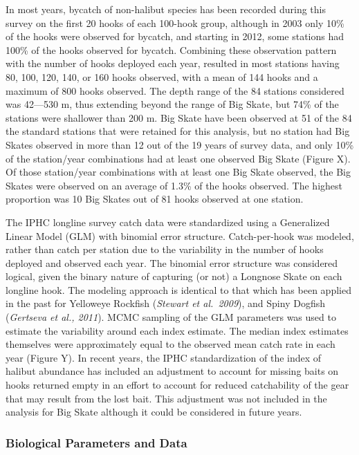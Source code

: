 \documentclass[12pt,]{article}
\begin{document}
In most years, bycatch of non-halibut species has been recorded during
this survey on the first 20 hooks of each 100-hook group, although in
2003 only 10\% of the hooks were observed for bycatch, and starting in
2012, some stations had 100\% of the hooks observed for bycatch.
Combining these observation pattern with the number of hooks deployed
each year, resulted in most stations having 80, 100, 120, 140, or 160
hooks observed, with a mean of 144 hooks and a maximum of 800 hooks
observed. The depth range of the 84 stations considered was 42---530 m,
thus extending beyond the range of Big Skate, but 74\% of the stations
were shallower than 200 m. Big Skate have been observed at 51 of the 84
the standard stations that were retained for this analysis, but no
station had Big Skates observed in more than 12 out of the 19 years of
survey data, and only 10\% of the station/year combinations had at least
one observed Big Skate (Figure X). Of those station/year combinations
with at least one Big Skate observed, the Big Skates were observed on an
average of 1.3\% of the hooks observed. The highest proportion was 10
Big Skates out of 81 hooks observed at one station.

The IPHC longline survey catch data were standardized using a
Generalized Linear Model (GLM) with binomial error structure.
Catch-per-hook was modeled, rather than catch per station due to the
variability in the number of hooks deployed and observed each year. The
binomial error structure was considered logical, given the binary nature
of capturing (or not) a Longnose Skate on each longline hook. The
modeling approach is identical to that which has been applied in the
past for Yelloweye Rockfish (\emph{Stewart et al.~2009}), and Spiny
Dogfish (\emph{Gertseva et al., 2011}). MCMC sampling of the GLM
parameters was used to estimate the variability around each index
estimate. The median index estimates themselves were approximately equal
to the observed mean catch rate in each year (Figure Y). In recent
years, the IPHC standardization of the index of halibut abundance has
included an adjustment to account for missing baits on hooks returned
empty in an effort to account for reduced catchability of the gear that
may result from the lost bait. This adjustment was not included in the
analysis for Big Skate although it could be considered in future years.
\newpage

\hypertarget{biological-parameters-and-data}{%
\subsubsection{Biological Parameters and
Data}\label{biological-parameters-and-data}}
\end{document}
